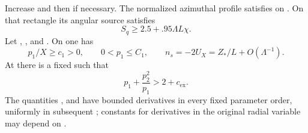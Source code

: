 \begin{proposition}\label{prop:B.3}
Increase  and then  if necessary.
The normalized azimuthal profile satisfies  on
. On that rectangle its angular source satisfies
\begin{equation}
  S_q\geq2.5+.95\Lambda L\chi.
  \tag{B.17}\label{eq:B.17}
\end{equation}
Let ,
, and . On
 one has
\begin{equation}
  p_1/X\geq c_1>0,
  \qquad 0<p_1\leq C_1,
  \qquad n_s=-2U_X=Z_*/L+O(\Lambda^{-1}).
  \tag{B.18}\label{eq:B.18}
\end{equation}
%
At  there is a fixed 
such that
\begin{equation}
  p_1+\frac{p_2^2}{p_1}>2+c_{\mathrm{ex}}.
  \tag{B.19}\label{eq:B.19}
\end{equation}
The quantities , and  have
bounded derivatives in every fixed parameter order, uniformly in subsequent
; constants for derivatives in the original radial variable
 may depend on .
\end{proposition}

